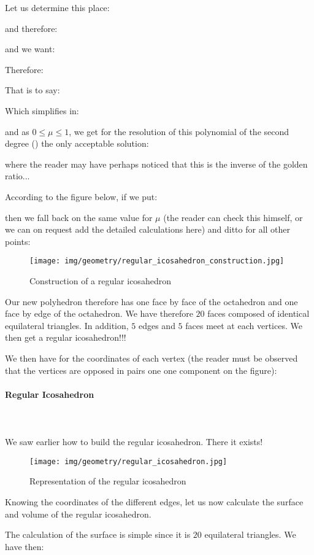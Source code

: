 {	Let us determine this place:
	
	and therefore:
	
	and we want:
	
	Therefore:
	
	That is to say:
	
	Which simplifies in:
	
	and as $0\leq \mu \leq 1$, we get for the resolution of this polynomial of the second degree () the only acceptable solution:
	
	where the reader may have perhaps noticed that this is the inverse of the golden ratio...
	
	According to the figure below, if we put:
	
	then we fall back on the same value for $\mu$ (the reader can check this himself, or we can on request add the detailed calculations here) and ditto for all other points:
	\begin{figure}[H]
		\centering
		\texttt{[image: img/geometry/regular\_icosahedron\_construction.jpg]}
		\caption{Construction of a regular icosahedron}
	\end{figure}
	Our new polyhedron therefore has one face by face of the octahedron and one face by edge of the octahedron. We have therefore $20$ faces composed of identical equilateral triangles. In addition, $5$ edges and $5$ faces meet at each vertices. We then get a regular icosahedron!!!
	
	We then have for the coordinates of each vertex (the reader must be observed that the vertices are opposed in pairs one one component on the figure):
	
	
	\paragraph{Regular Icosahedron}\mbox{}\\\\
	We saw earlier how to build the regular icosahedron. There it exists!
	\begin{figure}[H]
		\centering
		\texttt{[image: img/geometry/regular\_icosahedron.jpg]}
		\caption{Representation of the regular icosahedron}
	\end{figure}
	Knowing the coordinates of the different edges, let us now calculate the surface and volume of the regular icosahedron.
	
	The calculation of the surface is simple since it is $20$ equilateral triangles. We have then:
	
}
